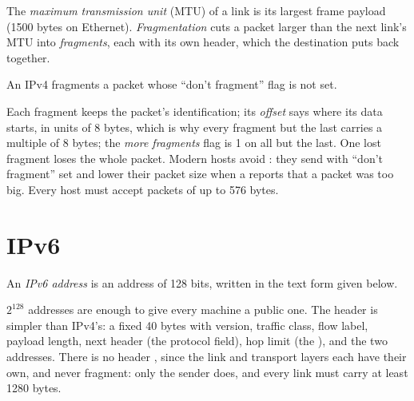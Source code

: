 \begin{definition}\label{def:b2:network-layer:fragmentation}
The \emph{maximum transmission unit} (MTU) of a link is its largest frame payload (1500 bytes on Ethernet).
\emph{Fragmentation} cuts a packet larger than the next link's MTU into \emph{fragments}, each with
its own header, which the destination puts back together.
\end{definition}

An IPv4  fragments a packet whose ``don't fragment'' flag is not set.

\label{out:b2:network-layer:fragment}

Each fragment keeps the packet's identification; its \emph{offset} says where its data starts, in units of 8 bytes,
which is why every fragment but the last carries a multiple of 8 bytes; the \emph{more fragments} flag is 1 on all
but the last. One lost fragment loses the whole packet. Modern hosts avoid : they send with ``don't
fragment'' set and lower their packet size when a  reports that a packet was too big. Every host must accept
packets of up to 576 bytes.

\section{IPv6}\label{sec:b2:network-layer:ipv6}

\begin{definition}\label{def:b2:network-layer:ipv6}
An \emph{IPv6 address} is an address of 128 bits, written in the text form given below.
\end{definition}

$2^{128}$ addresses are enough to give every machine a public one. The header is simpler
than IPv4's: a fixed 40 bytes with version, traffic class, flow label, payload length, next header (the protocol
field), hop limit (the ), and the two addresses. There is no header , since the link and
transport layers each have their own, and  never fragment: only the sender does, and every link must carry
at least 1280 bytes.

